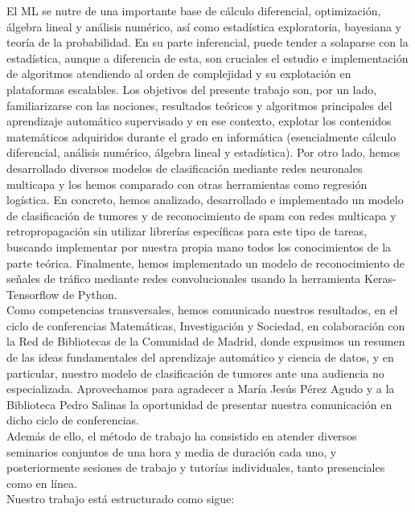 \documentclass[a4paper,11pt]{article}
\begin{document}
\noindent
El ML se nutre de una importante base de cálculo diferencial, optimización, álgebra lineal y análisis numérico, así como estadística exploratoria, bayesiana y teoría de la probabilidad. En su parte inferencial, puede tender a solaparse con la estadística, aunque a diferencia de esta, son cruciales el estudio e implementación de algoritmos atendiendo al orden de complejidad y su explotación en plataformas escalables.
Los objetivos del presente trabajo son, por un lado, familiarizarse con las nociones, resultados teóricos y algoritmos principales del aprendizaje automático
supervisado y en ese contexto, explotar los contenidos matemáticos adquiridos durante el grado en informática (esencialmente cálculo diferencial, análisis
numérico, álgebra lineal y estadística). Por otro lado, hemos desarrollado diversos modelos de clasificación mediante redes neuronales multicapa y los hemos
comparado con otras herramientas como regresión logística. En concreto, hemos
analizado, desarrollado e implementado un modelo de clasificación de tumores y
de reconocimiento de spam con redes multicapa y retropropagación sin utilizar librerías específicas para este tipo de tareas, buscando implementar por nuestra propia mano todos los conocimientos de la parte teórica. Finalmente, hemos
implementado un modelo de reconocimiento de señales de tráfico mediante redes convolucionales usando la herramienta Keras-Tensorflow de
Python.\\

\noindent
Como competencias transversales, hemos comunicado nuestros resultados, en el
ciclo de conferencias Matemáticas, Investigación y Sociedad, en colaboración con
la Red de Bibliotecas de la Comunidad de Madrid, donde expusimos un resumen
de las ideas fundamentales del aprendizaje automático y ciencia de datos, y en
particular, nuestro modelo de clasificación de tumores ante una audiencia no
especializada. Aprovechamos para agradecer a María Jesús Pérez Agudo y a la
Biblioteca Pedro Salinas la oportunidad de presentar nuestra comunicación en
dicho ciclo de conferencias.\\

\noindent
Además de ello, el método de trabajo ha consistido en atender diversos seminarios conjuntos de una hora y media de duración cada uno, y posteriormente sesiones de trabajo y tutorías individuales, tanto presenciales como en línea.\\

\noindent
Nuestro trabajo está estructurado como sigue:\\
\end{document}
